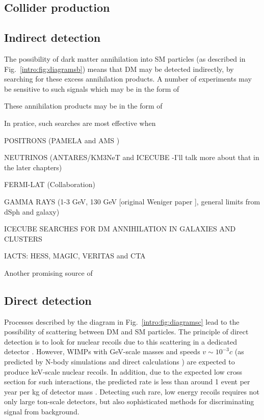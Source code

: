 \subsection{Collider production}

\subsection{Indirect detection}

The possibility of dark matter annihilation into SM particles (as described in Fig.~\ref{intro:fig:diagramsb}) means that DM may be detected indirectly, by searching for these excess annihilation products. A number of experiments may be sensitive to such signals which may be in the form of 

These annihilation products may be in the form of 

In pratice, such searches are most effective when 

POSITRONS (PAMELA \cite{Boezio:2009} and AMS \cite{Aguilar:2013})

NEUTRINOS (ANTARES/KM3NeT and ICECUBE \cite{Aartsen:2013b} -I'll talk more about that in the later chapters)

FERMI-LAT (Collaboration) \cite{Ackerman:2012}

GAMMA RAYS (1-3 GeV, 130 GeV [original Weniger paper \cite{Weniger:2012}], general limits from dSph and galaxy)

ICECUBE SEARCHES FOR DM ANNIHILATION IN GALAXIES AND CLUSTERS \cite{Aartsen:2013}

IACTS: HESS, MAGIC, VERITAS and CTA \cite{Doro:2013}

Another promising source of 


\subsection{Direct detection}

Processes described by the diagram in Fig.~\ref{intro:fig:diagramsc} lead to the possibility of scattering between DM and SM particles. The principle of direct detection is to look for nuclear recoils due to this scattering in a dedicated detector \cite{Goodman,Drukier}. However, WIMPs with GeV-scale masses and speeds $v \sim 10^{-3} c$ (as predicted by N-body simulations \cite{Diemand} and direct calculations \cite{}) are expected to produce keV-scale nuclear recoils. In addition, due to the expected low cross section for such interactions, the predicted rate is less than around 1 event per year per kg of detector mass . Detecting such rare, low energy recoils requires not only large ton-scale detectors, but also sophisticated methods for discriminating signal from background.



